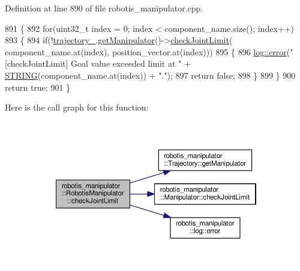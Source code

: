Definition at line 890 of file robotis\+\_\+manipulator.\+cpp.


\begin{DoxyCode}
891 \{
892   \textcolor{keywordflow}{for}(uint32\_t index = 0; index < component\_name.size(); index++)
893   \{
894     \textcolor{keywordflow}{if}(!\hyperlink{classrobotis__manipulator_1_1_robotis_manipulator_a992d2c7221bcaab8e9a688d12728d738}{trajectory\_}.\hyperlink{classrobotis__manipulator_1_1_trajectory_ae5276de42edf154de107c1f194f6b322}{getManipulator}()->\hyperlink{classrobotis__manipulator_1_1_manipulator_a715e5825f289765d1c6ce9687ce6c6e5}{checkJointLimit}(
      component\_name.at(index), position\_vector.at(index)))
895     \{
896       \hyperlink{namespacerobotis__manipulator_1_1log_a6a84cb5481107ad244344093086fb557}{log::error}(\textcolor{stringliteral}{"[checkJointLimit] Goal value exceeded limit at "} + 
      \hyperlink{robotis__manipulator__log_8h_a67f156408fa9d656017c406fe4f4b330}{STRING}(component\_name.at(index)) + \textcolor{stringliteral}{"."});
897       \textcolor{keywordflow}{return} \textcolor{keyword}{false};
898     \}
899   \}
900   \textcolor{keywordflow}{return} \textcolor{keyword}{true};
901 \}
\end{DoxyCode}


Here is the call graph for this function\+:\nopagebreak
\begin{figure}[H]
\begin{center}
\leavevmode
\includegraphics[width=350pt]{classrobotis__manipulator_1_1_robotis_manipulator_a552fd021bf33ae2f21ffdd18bb104fb5_cgraph}
\end{center}
\end{figure}


